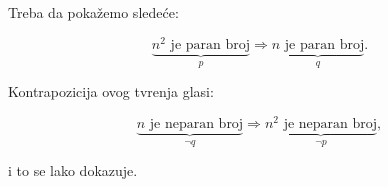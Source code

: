 \documentclass[11pt]{article}
\begin{document}
	\noindent
	Treba da poka\v zemo slede\' ce:

	\begin{equation*}
		\underbrace{n^2\text{ je paran broj}}_p \Rightarrow \underbrace{n\text{ je paran broj}}_q.
	\end{equation*}

	\noindent
	Kontrapozicija ovog tvr\dj enja glasi:
	
	\begin{equation*}
		\underbrace{n\text{ je neparan broj}}_{\neg q} \Rightarrow \underbrace{n^2\text{ je neparan broj}}_{\neg p},
	\end{equation*}

	\noindent
	i to se lako dokazuje.
\end{document}
